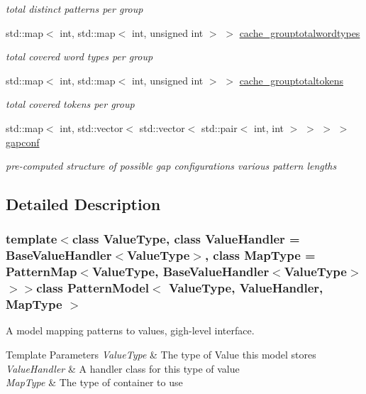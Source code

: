 \begin{DoxyCompactItemize}
\begin{DoxyCompactList}\small\item\em total distinct patterns per group \end{DoxyCompactList}\item 
std\+::map$<$ int, std\+::map$<$ int, unsigned int $>$ $>$ \hyperlink{classPatternModel_a4dee966a62bacaab4d107bb4ec5050c0}{cache\+\_\+grouptotalwordtypes}
\begin{DoxyCompactList}\small\item\em total covered word types per group \end{DoxyCompactList}\item 
std\+::map$<$ int, std\+::map$<$ int, unsigned int $>$ $>$ \hyperlink{classPatternModel_aebbf8c45dfa1993d1a9dd262b2b30783}{cache\+\_\+grouptotaltokens}
\begin{DoxyCompactList}\small\item\em total covered tokens per group \end{DoxyCompactList}\item 
std\+::map$<$ int, std\+::vector$<$ std\+::vector$<$ std\+::pair$<$ int, int $>$ $>$ $>$ $>$ \hyperlink{classPatternModel_a1070e4e96457caf4ae35d23c1e9ac5c3}{gapconf}
\begin{DoxyCompactList}\small\item\em pre-\/computed structure of possible gap configurations various pattern lengths \end{DoxyCompactList}\end{DoxyCompactItemize}


\subsection{Detailed Description}
\subsubsection*{template$<$class Value\+Type, class Value\+Handler = Base\+Value\+Handler$<$\+Value\+Type$>$, class Map\+Type = Pattern\+Map$<$\+Value\+Type, Base\+Value\+Handler$<$\+Value\+Type$>$$>$$>$class Pattern\+Model$<$ Value\+Type, Value\+Handler, Map\+Type $>$}

A model mapping patterns to values, gigh-\/level interface. 


\begin{DoxyTemplParams}{Template Parameters}
{\em Value\+Type} & The type of Value this model stores \\
\hline
{\em Value\+Handler} & A handler class for this type of value \\
\hline
{\em Map\+Type} & The type of container to use \\
\hline
\end{DoxyTemplParams}


